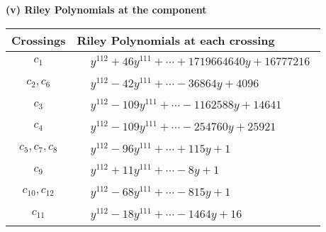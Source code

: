 \documentclass[1p]{elsarticle_modified}
\theoremstyle{definition}
\begin{document}
\newpage\renewcommand{\arraystretch}{1}
\flushleft \textbf{(v) Riley Polynomials at the component}\newline \\
\begin{tabular}{m{50pt}|m{274pt}}
Crossings & \hspace{64pt}Riley Polynomials at each crossing \\
\hline $$\begin{aligned}c_{1}\end{aligned}$$&$\begin{aligned}
&y^{112}+46 y^{111}+\cdots+1719664640 y+16777216
\end{aligned}$\\
\hline $$\begin{aligned}c_{2},c_{6}\end{aligned}$$&$\begin{aligned}
&y^{112}-42 y^{111}+\cdots-36864 y+4096
\end{aligned}$\\
\hline $$\begin{aligned}c_{3}\end{aligned}$$&$\begin{aligned}
&y^{112}-109 y^{111}+\cdots-1162588 y+14641
\end{aligned}$\\
\hline $$\begin{aligned}c_{4}\end{aligned}$$&$\begin{aligned}
&y^{112}-109 y^{111}+\cdots-254760 y+25921
\end{aligned}$\\
\hline $$\begin{aligned}c_{5},c_{7},c_{8}\end{aligned}$$&$\begin{aligned}
&y^{112}-96 y^{111}+\cdots+115 y+1
\end{aligned}$\\
\hline $$\begin{aligned}c_{9}\end{aligned}$$&$\begin{aligned}
&y^{112}+11 y^{111}+\cdots-8 y+1
\end{aligned}$\\
\hline $$\begin{aligned}c_{10},c_{12}\end{aligned}$$&$\begin{aligned}
&y^{112}-68 y^{111}+\cdots-815 y+1
\end{aligned}$\\
\hline $$\begin{aligned}c_{11}\end{aligned}$$&$\begin{aligned}
&y^{112}-18 y^{111}+\cdots-1464 y+16
\end{aligned}$\\
\hline
\end{tabular}\\~\\
\end{document}
